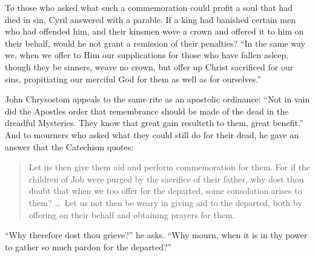 To those who asked what such a commemoration could profit a soul that had died in sin, Cyril answered with a parable. If a king had banished certain men who had offended him, and their kinsmen wove a crown and offered it to him on their behalf, would he not grant a remission of their penalties? ``In the same way we, when we offer to Him our supplications for those who have fallen asleep, though they be sinners, weave no crown, but offer up Christ sacrificed for our sins, propitiating our merciful God for them as well as for ourselves.''

John Chrysostom appeals to the same rite as an apostolic ordinance: ``Not in vain did the Apostles order that remembrance should be made of the dead in the dreadful Mysteries. They know that great gain resulteth to them, great benefit.'' And to mourners who asked what they could still do for their dead, he gave an answer that the Catechism quotes:

\begin{quote}
Let us then give them aid and perform commemoration for them. For if the children of Job were purged by the sacrifice of their father, why dost thou doubt that when we too offer for the departed, some consolation arises to them? \ldots\ Let us not then be weary in giving aid to the departed, both by offering on their behalf and obtaining prayers for them.
\end{quote}

\noindent ``Why therefore dost thou grieve?'' he asks. ``Why mourn, when it is in thy power to gather so much pardon for the departed?''

